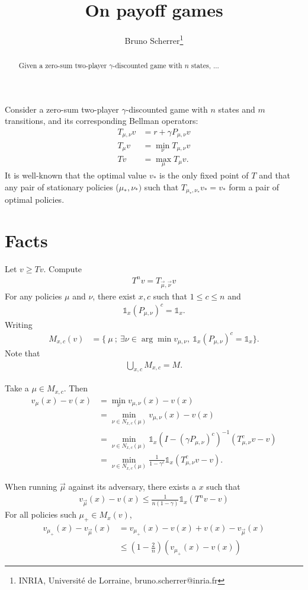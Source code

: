\documentclass{article}
\title{On payoff games}
\author{Bruno Scherrer\footnote{INRIA, Universit\'e de Lorraine, bruno.scherrer@inria.fr}}
\def\1{{\mathds 1}}
\begin{document}
\maketitle

\begin{abstract}
  Given a zero-sum two-player $\gamma$-discounted game with $n$ states, ...
\end{abstract}

Consider a zero-sum two-player $\gamma$-discounted game with $n$ states and $m$ transitions, and its corresponding Bellman operators:
\begin{align}
  T_{\mu,\nu}v & = r + \gamma P_{\mu,\nu}v \\
  T_{\mu}v & = \min_{\nu} T_{\mu,\nu}v \\
  Tv & = \max_{\mu} T_{\mu}v.
\end{align}
It is well-known that the optimal value $v_*$ is the only fixed point of $T$ and that any pair of stationary policies ($\mu_*,\nu_*)$ such that $T_{\mu_*,\nu_*}v_*=v_*$ form a pair of optimal policies.

\section{Facts}

Let $v\ge Tv$.
Compute
\begin{align}
  T^n v = T_{\vec\mu,\vec\nu}v
\end{align}
For any policies $\mu$ and $\nu$, there exist $x,c$ such that $1 \le c \le n$ and
\begin{align}
  \1_x (P_{\mu,\nu})^c = \1_x.
\end{align}
Writing
\begin{align}
  M_{x,c}(v) &= \{~ \mu ~;~ \exists \nu \in \arg\min v_{\mu,\nu}, ~\1_x (P_{\mu,\nu})^c = \1_x \}.
\end{align}
Note that
\begin{align}
  \bigcup_{x,c} M_{x,c} = M.
\end{align}

Take a $\mu \in M_{x,c}$.
Then
\begin{align}
  v_\mu(x) - v(x) & = \min_\nu v_{\mu,\nu}(x) - v(x) \\
  & = \min_{\nu \in N_{x,c}(\mu)} v_{\mu,\nu}(x) - v(x) \\
  & = \min_{\nu \in N_{x,c}(\mu)} \1_x (I-(\gamma P_{\mu,\nu})^c)^{-1}(T_{\mu,\nu}^c v - v) \\
  & = \min_{\nu \in N_{x,c}(\mu)} \frac{1}{1-\gamma^c}\1_x(T_{\mu,\nu}^c v - v).
\end{align}

When running $\vec\mu$ against its adversary, there exists a $x$ such that
\begin{align}
  v_{\vec\mu}(x) - v(x) \le  \frac{1}{n(1-\gamma)} \1_x(T^n v - v)
\end{align}
For all policies such $\mu_+ \in M_x(v)$,
\begin{align}
  v_{\mu_+}(x) - v_{\vec\mu}(x) &= v_{\mu_+}(x) - v(x) + v(x) - v_{\vec\mu}(x) \\
  & \le (1-\frac{2}{n}) (v_{\mu_+}(x)-v(x))
\end{align}



 
\end{document}
